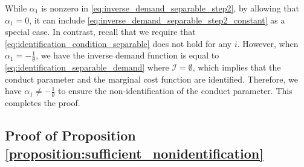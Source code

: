 \documentclass[11pt, a4paper]{article}
\theoremstyle{remark}
\begin{document}
While $\alpha_1$ is nonzero in \eqref{eq:inverse_demand_separable_step2}, by allowing that $\alpha_1 = 0$, it can include \eqref{eq:inverse_demand_separable_step2_constant} as a special case.
In contrast, recall that we require that \eqref{eq:identification_condition_separable} does not hold for any $i$.
However, when $\alpha_1 = -\frac{1}{\theta}$, we have the inverse demand function is equal to \eqref{eq:identification_separable_demand} where $\mathcal{I} = \emptyset$, which implies that the conduct parameter and the marginal cost function are identified. 
Therefore, we have $\alpha_1 \ne -\frac{1}{\theta}$ to ensure the non-identification of the conduct parameter.
This completes the proof.






\subsection{Proof of Proposition \ref{proposition:sufficient_nonidentification}}
\end{document}
